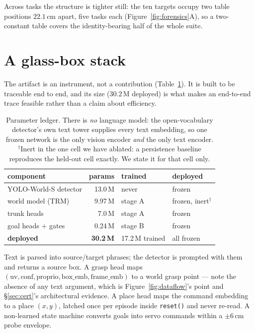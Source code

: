 \documentclass[10pt,twocolumn]{article}
\begin{document}
Across tasks the structure is tighter still: the ten targets occupy two table
positions $22.1$\,cm apart, five tasks each (Figure~\ref{fig:forensics}A), so a
two-constant table covers the identity-bearing half of the whole suite.

\section{A glass-box stack}
\label{sec:platform}

The artifact is an instrument, not a contribution (Table~\ref{tab:ledger}). It is built to be traceable
end to end, and its size ($30.2$\,M deployed) is what makes an end-to-end trace
feasible rather than a claim about efficiency.

\begin{table}[h]\centering\footnotesize
\setlength{\tabcolsep}{3.5pt}
\begin{tabular}{lrll}
\toprule
component & params & trained & deployed \\
\midrule
YOLO-World-S detector & 13.0\,M & never & frozen \\
world model (TRM) & 9.97\,M & stage A & frozen, inert$^\dagger$ \\
trunk heads & 7.0\,M & stage A & frozen \\
goal heads $+$ gates & 0.24\,M & stage B & frozen \\
\midrule
\textbf{deployed} & \textbf{30.2\,M} & 17.2\,M trained & all frozen \\
\bottomrule
\end{tabular}
\caption{Parameter ledger. There is \emph{no} language model: the
open-vocabulary detector's own text tower supplies every text embedding, so one
frozen network is the only vision encoder \emph{and} the only text encoder.
$^\dagger$Inert in the one cell we have ablated: a persistence baseline
reproduces the held-out cell exactly. We state it for that cell only.}
\label{tab:ledger}
\end{table}

Text is parsed into source/target phrases; the detector is prompted with them
and returns a source box. A grasp head maps
$(\text{uv}, \text{conf}, \text{proprio}, \text{box\_emb}, \text{frame\_emb})$
to a world grasp point --- note the absence of any text argument, which is
Figure~\ref{fig:dataflow}'s point and \S\ref{sec:cert}'s architectural evidence.
A place head maps the command embedding to a place $(x,y)$, latched once per
episode inside \texttt{reset()} and never re-read. A non-learned state machine
converts goals into servo commands within a $\pm6$\,cm probe envelope.
\end{document}
